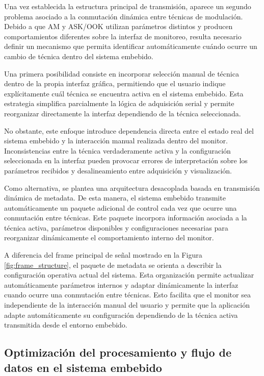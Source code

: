 Una vez establecida la estructura principal de transmisión, aparece un segundo problema asociado a la conmutación dinámica entre técnicas de modulación. Debido a que AM y ASK/OOK utilizan parámetros distintos y producen comportamientos diferentes sobre la interfaz de monitoreo, resulta necesario definir un mecanismo que permita identificar automáticamente cuándo ocurre un cambio de técnica dentro del sistema embebido.

Una primera posibilidad consiste en incorporar selección manual de técnica dentro de la propia interfaz gráfica, permitiendo que el usuario indique explícitamente cuál técnica se encuentra activa en el sistema embebido. Esta estrategia simplifica parcialmente la lógica de adquisición serial y permite reorganizar directamente la interfaz dependiendo de la técnica seleccionada.

No obstante, este enfoque introduce dependencia directa entre el estado real del sistema embebido y la interacción manual realizada dentro del monitor. Inconsistencias entre la técnica verdaderamente activa y la configuración seleccionada en la interfaz pueden provocar errores de interpretación sobre los parámetros recibidos y desalineamiento entre adquisición y visualización.

Como alternativa, se plantea una arquitectura desacoplada basada en transmisión dinámica de metadata. De esta manera, el sistema embebido transmite automáticamente un paquete adicional de control cada vez que ocurre una conmutación entre técnicas. Este paquete incorpora información asociada a la técnica activa, parámetros disponibles y configuraciones necesarias para reorganizar dinámicamente el comportamiento interno del monitor.

A diferencia del frame principal de señal mostrado en la Figura \ref{fig:frame_structure}, el paquete de metadata se orienta a describir la configuración operativa actual del sistema. Esta organización permite actualizar automáticamente parámetros internos y adaptar dinámicamente la interfaz cuando ocurre una conmutación entre técnicas. Esto facilita que el monitor sea independiente de la interacción manual del usuario y permite que la aplicación adapte automáticamente su configuración dependiendo de la técnica activa transmitida desde el entorno embebido.



\subsection{Optimización del procesamiento y flujo de datos en el sistema embebido}

